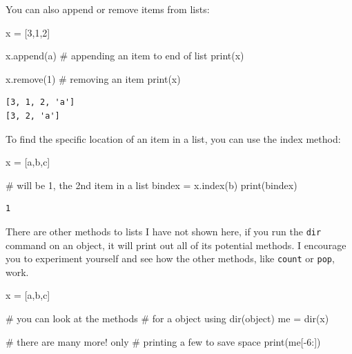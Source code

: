 \documentclass[
  letterpaper,
]{scrbook}
\newenvironment{Shaded}{\begin{snugshade}}{\end{snugshade}}
\newcommand{\BuiltInTok}[1]{\textcolor[rgb]{0.00,0.23,0.31}{#1}}
\newcommand{\CommentTok}[1]{\textcolor[rgb]{0.37,0.37,0.37}{#1}}
\newcommand{\DecValTok}[1]{\textcolor[rgb]{0.68,0.00,0.00}{#1}}
\newcommand{\NormalTok}[1]{\textcolor[rgb]{0.00,0.23,0.31}{#1}}
\newcommand{\OperatorTok}[1]{\textcolor[rgb]{0.37,0.37,0.37}{#1}}
\newcommand{\StringTok}[1]{\textcolor[rgb]{0.13,0.47,0.30}{#1}}
\begin{document}
You can also append or remove items from lists:

\begin{Shaded}
\begin{Highlighting}[]
\NormalTok{x }\OperatorTok{=}\NormalTok{ [}\DecValTok{3}\NormalTok{,}\DecValTok{1}\NormalTok{,}\DecValTok{2}\NormalTok{]}

\NormalTok{x.append(}\StringTok{\textquotesingle{}a\textquotesingle{}}\NormalTok{) }\CommentTok{\# appending an item to end of list}
\BuiltInTok{print}\NormalTok{(x)}

\NormalTok{x.remove(}\DecValTok{1}\NormalTok{) }\CommentTok{\# removing an item}
\BuiltInTok{print}\NormalTok{(x)}
\end{Highlighting}
\end{Shaded}

\begin{verbatim}
[3, 1, 2, 'a']
[3, 2, 'a']
\end{verbatim}

To find the specific location of an item in a list, you can use the
index method:

\begin{Shaded}
\begin{Highlighting}[]
\NormalTok{x }\OperatorTok{=}\NormalTok{ [}\StringTok{\textquotesingle{}a\textquotesingle{}}\NormalTok{,}\StringTok{\textquotesingle{}b\textquotesingle{}}\NormalTok{,}\StringTok{\textquotesingle{}c\textquotesingle{}}\NormalTok{]}

\CommentTok{\# will be 1, the 2nd item in a list}
\NormalTok{bindex }\OperatorTok{=}\NormalTok{ x.index(}\StringTok{\textquotesingle{}b\textquotesingle{}}\NormalTok{)}
\BuiltInTok{print}\NormalTok{(bindex)}
\end{Highlighting}
\end{Shaded}

\begin{verbatim}
1
\end{verbatim}

There are other methods to lists I have not shown here, if you run the
\texttt{dir} command on an object, it will print out all of its
potential methods. I encourage you to experiment yourself and see how
the other methods, like \texttt{count} or \texttt{pop}, work.

\begin{Shaded}
\begin{Highlighting}[]
\NormalTok{x }\OperatorTok{=}\NormalTok{ [}\StringTok{\textquotesingle{}a\textquotesingle{}}\NormalTok{,}\StringTok{\textquotesingle{}b\textquotesingle{}}\NormalTok{,}\StringTok{\textquotesingle{}c\textquotesingle{}}\NormalTok{]}

\CommentTok{\# you can look at the methods}
\CommentTok{\# for a object using dir(object)}
\NormalTok{me }\OperatorTok{=} \BuiltInTok{dir}\NormalTok{(x)}

\CommentTok{\# there are many more! only}
\CommentTok{\# printing a few to save space}
\BuiltInTok{print}\NormalTok{(me[}\OperatorTok{{-}}\DecValTok{6}\NormalTok{:])}
\end{Highlighting}
\end{Shaded}
\end{document}
